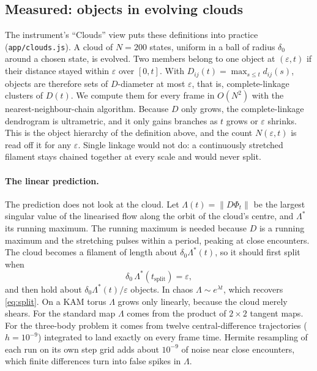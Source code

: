 \documentclass[11pt]{article}
\theoremstyle{remark}
\begin{document}
\subsection{Measured: objects in evolving clouds}
\label{sec:clouds}

The instrument's ``Clouds'' view puts these definitions into practice
(\texttt{app/clouds.js}). A cloud of $N=200$ states, uniform in a ball of radius $\delta_0$ around a chosen
state, is evolved. Two members belong to one object at $(\varepsilon,t)$ if their distance stayed within
$\varepsilon$ over $[0,t]$. With $D_{ij}(t)=\max_{s\le t}d_{ij}(s)$, objects are therefore sets of $D$-diameter at
most $\varepsilon$, that is, complete-linkage clusters of $D(t)$. We compute them for every frame in $O(N^2)$ with
the nearest-neighbour-chain algorithm. Because $D$ only grows, the complete-linkage dendrogram is ultrametric,
and it only gains branches as $t$ grows or $\varepsilon$ shrinks. This is the object hierarchy of the definition
above, and the count $N(\varepsilon,t)$ is read off it for any $\varepsilon$. Single linkage would not do: a
continuously stretched filament stays chained together at every scale and would never split.

\paragraph{The linear prediction.} The prediction does not look at the cloud. Let $\Lambda(t)=\|D\Phi_t\|$ be
the largest singular value of the linearised flow along the orbit of the cloud's centre, and $\Lambda^*$ its
running maximum. The running maximum is needed because $D$ is a running maximum and the stretching pulses within a
period, peaking at close encounters. The cloud becomes a filament of length about $\delta_0\Lambda^*(t)$, so it
should first split when
\begin{equation}
  \delta_0\,\Lambda^*(t_{\text{split}})=\varepsilon ,
  \label{eq:splitmeasured}
\end{equation}
and then hold about $\delta_0\Lambda^*(t)/\varepsilon$ objects. In chaos $\Lambda\sim e^{\lambda t}$, which
recovers \eqref{eq:split}. On a KAM torus $\Lambda$ grows only linearly, because the cloud merely shears. For the
standard map $\Lambda$ comes from the product of $2\times2$ tangent maps. For the three-body problem it comes from
twelve central-difference trajectories ($h=10^{-9}$) integrated to land exactly on every frame time. Hermite
resampling of each run on its own step grid adds about $10^{-9}$ of noise near close encounters, which
finite differences turn into false spikes in $\Lambda$.
\end{document}
